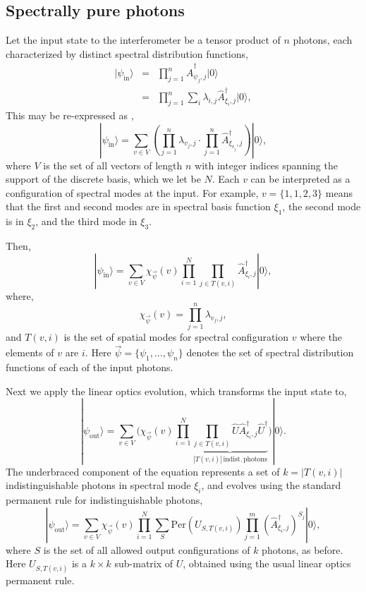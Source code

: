 \documentclass[aps,pra,twocolumn,amsmath,amssymb,nofootinbib,superscriptaddress]{revtex4}
\newcommand{\ket}[1]{|#1\rangle}
\begin{document}
\subsection{Spectrally pure photons}

Let the input state to the interferometer be a tensor product of $n$ photons, each characterized by distinct spectral distribution functions,
\begin{eqnarray}
\ket{\psi_\mathrm{in}} &=& \prod_{j=1}^n \hat{A}_{\psi_j,j}^\dag \ket{0} \nonumber \\
&=& \prod_{j=1}^n \sum_i \lambda_{i,j} \hat{A}_{\xi_i,j}^\dag \ket{0},
\end{eqnarray}
This may be re-expressed as \cite{bib:RohdeLowFid12},
\begin{equation}
\ket{\psi_\mathrm{in}} = \sum_{v\in V} \left(\prod_{j=1}^n \lambda_{v_j,j} \cdot \prod_{j=1}^n \hat{A}_{\xi_{v_j},j}^\dag \right) \ket{0},
\end{equation}
where $V$ is the set of all vectors of length $n$ with integer indices spanning the support of the discrete basis, which we let be $N$. Each $v$ can be interpreted as a configuration of spectral modes at the input. For example, \mbox{$v=\{1,1,2,3\}$} means that the first and second modes are in spectral basis function $\xi_1$, the second mode is in $\xi_2$, and the third mode in $\xi_3$.

Then,
\begin{equation}
\ket{\psi_\mathrm{in}} = \sum_{v\in V} \chi_{\vec\psi}(v) \prod_{i=1}^N \prod_{j\in T(v,i)} \hat{A}_{\xi_i,j}^\dag \ket{0},
\end{equation}
where,
\begin{equation}
\chi_{\vec\psi}(v) = \prod_{j=1}^n \lambda_{v_j,j},
\end{equation}
and \mbox{$T(v,i)$} is the set of spatial modes for spectral configuration $v$ where the elements of $v$ are $i$. Here \mbox{$\vec\psi=\{\psi_1,\dots,\psi_n\}$} denotes the set of spectral distribution functions of each of the input photons.

Next we apply the linear optics evolution, which transforms the input state to,
\begin{equation}
\ket{\psi_\mathrm{out}} = \sum_{v\in V} \Bigg(\chi_{\vec\psi}(v) \prod_{i=1}^N \underbrace{\prod_{j\in T(v,i)} \hat{U} \hat{A}_{\xi_i,j}^\dag \hat{U}^\dag}_{|T(v,i)|\,\mathrm{indist.\,photons}} \Bigg) \ket{0}.
\end{equation}
The underbraced component of the equation represents a set of $k=|T(v,i)|$ indistinguishable photons in spectral mode $\xi_i$, and evolves using the standard permanent rule for indistinguishable photons,
\begin{equation} \label{eq:generalOut}
\ket{\psi_\mathrm{out}} = \sum_{v\in V} \chi_{\vec\psi}(v) \prod_{i=1}^N \sum_S \mathrm{Per}\left(U_{S,T(v,i)}\right) \prod_{j=1}^m \left(\hat{A}^\dag_{\xi_i,j}\right)^{S_j} \ket{0},
\end{equation}
where $S$ is the set of all allowed output configurations of $k$ photons, as before. Here \mbox{$U_{S,T(v,i)}$} is a \mbox{$k\times k$} sub-matrix of $U$, obtained using the usual linear optics permanent rule.
\end{document}
